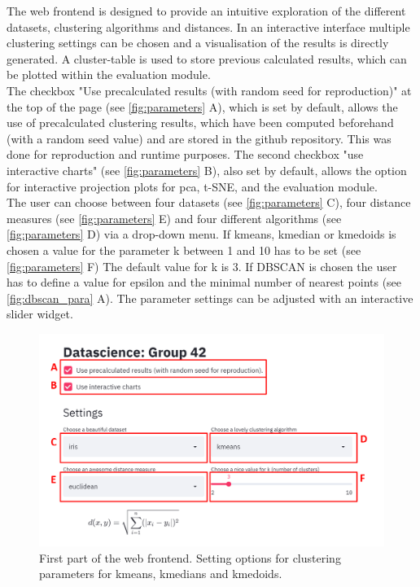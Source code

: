 The web frontend is designed to provide an intuitive exploration of the different datasets, clustering algorithms and distances. In an interactive interface multiple clustering settings can be chosen and a visualisation of the results is directly generated. 
A cluster-table is used to store previous calculated results, which can be plotted within the evaluation module. \\
The checkbox "Use precalculated results (with random seed for reproduction)" at the top of the page (see \autoref{fig:parameters} A), which is set by default, allows the use of precalculated clustering results, which have been computed beforehand (with a random seed value) and are stored in the github repository. This was done for reproduction and runtime purposes. The second checkbox "use interactive charts" (see \autoref{fig:parameters} B), also set by default, allows the option for interactive projection plots for \acrshort{pca}, \acrshort{t-SNE}, and the evaluation module.  \\
The user can choose between four datasets (see \autoref{fig:parameters} C), four distance measures (see \autoref{fig:parameters} E) and four different algorithms (see \autoref{fig:parameters} D) via a drop-down menu. If kmeans, kmedian or kmedoids is chosen a value for the parameter k between 1 and 10 has to be set (see \autoref{fig:parameters} F) The default value for k is 3. If DBSCAN is chosen the user has to define a value for epsilon and the minimal number of nearest points (see \autoref{fig:dbscan_para} A). The parameter settings can be adjusted with an interactive slider widget. \\
\begin{figure}[H]
	\centering
	\includegraphics[width=\linewidth]{modules/web_frontend/eingabe_letters}
	\caption{First part of the web frontend. Setting options for clustering parameters for kmeans, kmedians and kmedoids.}\label{fig:parameters}
\end{figure}
